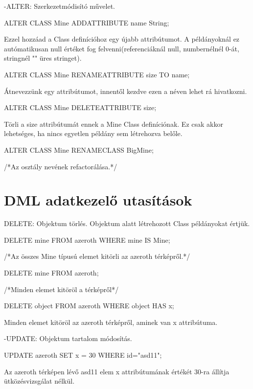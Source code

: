 \begin{sql}
-ALTER: Szerkezetmódisító művelet. 
\begin{sql}
ALTER CLASS Mine ADDATTRIBUTE name String;
\end{sql}
Ezzel hozzáad a Class definícióhoz egy újabb attribútumot. A példányoknál ez autómatikusan null értéket fog felvenni(referenciáknál null, numbernélnél 0-át, stringnél "" üres stringet).

\begin{sql}
ALTER CLASS Mine RENAMEATTRIBUTE size TO name;
\end{sql}
Átnevezzünk egy attribútumot, innentől kezdve ezen a néven lehet rá hivatkozni.

\begin{sql}
ALTER CLASS Mine DELETEATTRIBUTE size;
\end{sql}
Törli a size attribútumát ennek a Mine Class definíciónak. Ez csak akkor lehetséges, ha nincs egyetlen példány sem létrehozva belőle.

\begin{sql}
ALTER CLASS Mine RENAMECLASS BigMine;
\end{sql}
/*Az osztály nevének refactorálása.*/

\section{DML adatkezelő utasítások}

DELETE: Objektum törlés. Objektum alatt létrehozott Class példányokat értjük.

\begin{sql}
DELETE mine FROM azeroth WHERE  mine IS Mine;
\end{sql}
/*Az összes Mine típusú elemet kitörli az azeroth térképről.*/
\begin{sql}
DELETE mine FROM azeroth;
\end{sql}
/*Minden elemet kitöröl a térképről*/
\begin{sql}
DELETE object FROM azeroth WHERE object HAS x;
\end{sql}
Minden elemet kitöröl az azeroth térképről, aminek van x attribútuma.

-UPDATE: Objektum tartalom módosítás.
\begin{sql}
UPDATE azeroth SET x = 30 WHERE id="asd11";
\end{sql}
Az azeroth térképen lévő asd11 elem x attribútumának értékét 30-ra állítja ütközésvizsgálat nélkül.


\end{sql}
